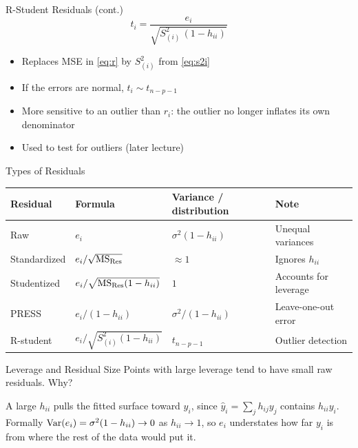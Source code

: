 \begin{frame}{R-Student Residuals (cont.)}
    \[
        t_i = \frac{e_i}{\sqrt{S_{(i)}^2\,(1-h_{ii})}}
    \]
    \begin{itemize}
        \item Replaces MSE in \eqref{eq:r} by $S_{(i)}^2$ from \eqref{eq:s2i}
        \item If the errors are normal, $t_i\sim t_{n-p-1}$
        \item More sensitive to an outlier than $r_i$: the outlier no longer inflates its own denominator
        \item Used to test for outliers (later lecture)
    \end{itemize}
\end{frame}


\begin{frame}{Types of Residuals}
    \begin{center}
        \begin{tabular}{llll}
            \toprule
            Residual & Formula & Variance / distribution & Note \\
            \midrule
            Raw & $e_i$ & $\sigma^2(1-h_{ii})$ & Unequal variances \\
            Standardized & $e_i/\sqrt{\mathrm{MS}_{\mathrm{Res}}}$ & $\approx 1$ & Ignores $h_{ii}$ \\
            Studentized & $e_i/\sqrt{\mathrm{MS}_{\mathrm{Res}}(1-h_{ii})}$ & $1$ & Accounts for leverage \\
            PRESS & $e_i/(1-h_{ii})$ & $\sigma^2/(1-h_{ii})$ & Leave-one-out error \\
            R-student & $e_i/\sqrt{S_{(i)}^2(1-h_{ii})}$ & $t_{n-p-1}$ & Outlier detection \\
            \bottomrule
        \end{tabular}
    \end{center}
\end{frame}


\begin{frame}{Leverage and Residual Size}
    Points with large leverage tend to have small raw residuals. Why?

    \pause

    \svspace{1em}

    A large $h_{ii}$ pulls the fitted surface toward $y_i$, since $\hat y_i=\sum_j h_{ij}y_j$ contains $h_{ii}y_i$. Formally $\operatorname{Var}(e_i)=\sigma^2(1-h_{ii})\to 0$ as $h_{ii}\to 1$, so $e_i$ understates how far $y_i$ is from where the rest of the data would put it.
\end{frame}


